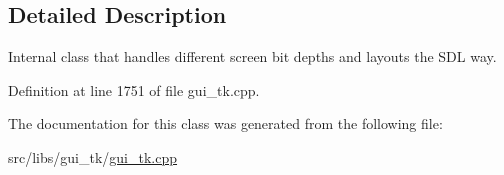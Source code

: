 \subsection{Detailed Description}
Internal class that handles different screen bit depths and layouts the S\-D\-L way. 

Definition at line 1751 of file gui\-\_\-tk.\-cpp.



The documentation for this class was generated from the following file\-:\begin{DoxyCompactItemize}
\item 
src/libs/gui\-\_\-tk/\hyperlink{gui__tk_8cpp}{gui\-\_\-tk.\-cpp}\end{DoxyCompactItemize}
